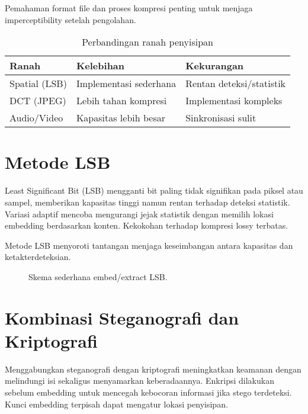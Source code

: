\documentclass[../main.tex]{subfiles}
\begin{document}
Pemahaman format file dan proses kompresi penting untuk menjaga imperceptibility setelah pengolahan.

\begin{table}[h]
\centering
\caption{Perbandingan ranah penyisipan}
\label{tab:steg-domain}
\begin{tabular}{lll}
\toprule
Ranah & Kelebihan & Kekurangan \\
\midrule
Spatial (LSB) & Implementasi sederhana & Rentan deteksi/statistik \parencite{lsb-overview} \\
DCT (JPEG) & Lebih tahan kompresi & Implementasi kompleks \parencite{westfeld2001f5} \\
Audio/Video & Kapasitas lebih besar & Sinkronisasi sulit \\
\bottomrule
\end{tabular}
\end{table}

\section{Metode LSB}
Least Significant Bit (LSB) mengganti bit paling tidak signifikan pada piksel atau sampel, memberikan kapasitas tinggi namun rentan terhadap deteksi statistik. Variasi adaptif mencoba mengurangi jejak statistik dengan memilih lokasi embedding berdasarkan konten. Kekokohan terhadap kompresi lossy terbatas.

Metode LSB menyoroti tantangan menjaga keseimbangan antara kapasitas dan ketakterdeteksian.

\begin{figure}[h]
\centering
{}
\caption{Skema sederhana embed/extract LSB.}
\label{fig:lsb-flow}
\end{figure}

\section{Kombinasi Steganografi dan Kriptografi}
Menggabungkan steganografi dengan kriptografi meningkatkan keamanan dengan melindungi isi sekaligus menyamarkan keberadaannya. Enkripsi dilakukan sebelum embedding untuk mencegah kebocoran informasi jika stego terdeteksi. Kunci embedding terpisah dapat mengatur lokasi penyisipan.
\end{document}
